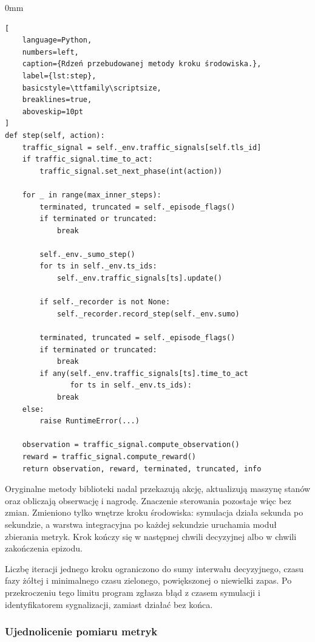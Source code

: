 \begin{addmargin}[8mm]{0mm}
\begin{lstlisting}[
    language=Python,
    numbers=left,
    caption={Rdzeń przebudowanej metody kroku środowiska.},
    label={lst:step},
    basicstyle=\ttfamily\scriptsize,
    breaklines=true,
    aboveskip=10pt
]
def step(self, action):
    traffic_signal = self._env.traffic_signals[self.tls_id]
    if traffic_signal.time_to_act:
        traffic_signal.set_next_phase(int(action))

    for _ in range(max_inner_steps):
        terminated, truncated = self._episode_flags()
        if terminated or truncated:
            break

        self._env._sumo_step()
        for ts in self._env.ts_ids:
            self._env.traffic_signals[ts].update()

        if self._recorder is not None:
            self._recorder.record_step(self._env.sumo)

        terminated, truncated = self._episode_flags()
        if terminated or truncated:
            break
        if any(self._env.traffic_signals[ts].time_to_act
               for ts in self._env.ts_ids):
            break
    else:
        raise RuntimeError(...)

    observation = traffic_signal.compute_observation()
    reward = traffic_signal.compute_reward()
    return observation, reward, terminated, truncated, info
\end{lstlisting}
\end{addmargin}

Oryginalne metody biblioteki nadal przekazują akcję, aktualizują maszynę stanów oraz obliczają obserwację i nagrodę. Znaczenie sterowania pozostaje więc bez zmian. Zmieniono tylko wnętrze kroku środowiska: symulacja działa sekunda po sekundzie, a warstwa integracyjna po każdej sekundzie uruchamia moduł zbierania metryk. Krok kończy się w następnej chwili decyzyjnej albo w chwili zakończenia epizodu.

Liczbę iteracji jednego kroku ograniczono do sumy interwału decyzyjnego, czasu fazy żółtej i minimalnego czasu zielonego, powiększonej o niewielki zapas. Po przekroczeniu tego limitu program zgłasza błąd z czasem symulacji i identyfikatorem sygnalizacji, zamiast działać bez końca.

\subsubsection{Ujednolicenie pomiaru metryk}
\label{subsubsec:ujednolicenie-metryk}

